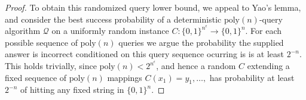 \documentclass[11pt]{article}
\newcommand{\B}{\{0,1\}}
\renewcommand{\poly}{\mathrm{poly}}
\begin{document}
\begin{proof}
To obtain this randomized query lower bound, we appeal to Yao's lemma, and consider the best success probability of a deterministic $\poly(n)$-query algorithm $\mathcal{Q}$ on a uniformly random instance $C: \B^{n^\epsilon} \to \B^n$. For each possible sequence of $\poly(n)$ queries we argue the probability the supplied answer is incorrect conditioned on this query sequence ocurring is is at least $2^{-n}$. This holds trivially, since $\poly(n) < 2^{n^\epsilon}$, and hence a random $C$ extending a fixed sequence of $\poly(n)$ mappings $C(x_1) = y_1,\ldots, $ has probability at least $2^{-n}$ of hitting any fixed string in $\B^n$.
\end{proof}

\end{document}
